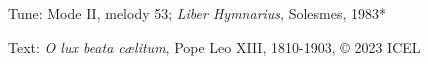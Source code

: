 

\begin{hymnsource}
Tune: Mode II, melody 53; \emph{Liber Hymnarius}, Solesmes, 1983*

Text: \emph{O lux beata cælitum}, Pope Leo XIII, 1810-1903, © 2023 ICEL
\end{hymnsource}

